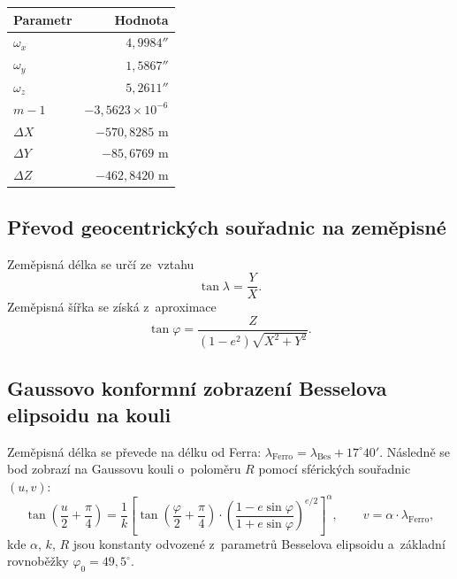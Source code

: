 \documentclass[11pt, a4paper]{article}
\begin{document}
\begin{table}[h!]
\centering
\begin{tabular}{l r}
\toprule
\textbf{Parametr} & \textbf{Hodnota} \\
\midrule
$\omega_x$ & $4{,}9984''$ \\
$\omega_y$ & $1{,}5867''$ \\
$\omega_z$ & $5{,}2611''$ \\
$m-1$ & $-3{,}5623 \times 10^{-6}$ \\
$\Delta X$ & $-570{,}8285$ m \\
$\Delta Y$ & $-85{,}6769$ m \\
$\Delta Z$ & $-462{,}8420$ m \\
\bottomrule
\end{tabular}
\end{table}

\subsection{Převod geocentrických souřadnic na zeměpisné}

Zeměpisná délka se určí ze~vztahu
\begin{equation}
    \tan\lambda = \frac{Y}{X}.
\end{equation}
Zeměpisná šířka se získá z~aproximace
\begin{equation}
    \tan\varphi = \frac{Z}{(1-e^2)\sqrt{X^2 + Y^2}}.
\end{equation}

\subsection{Gaussovo konformní zobrazení Besselova elipsoidu na kouli}

Zeměpisná délka se převede na délku od Ferra: $\lambda_{\mathrm{Ferro}} = \lambda_{\mathrm{Bes}} + 17^{\circ}40'$. Následně se bod zobrazí na Gaussovu kouli o~poloměru $R$ pomocí sférických souřadnic $(u, v)$:
\begin{equation}
    \tan\left(\frac{u}{2} + \frac{\pi}{4}\right)
    = \frac{1}{k} \left[
    \tan\left(\frac{\varphi}{2} + \frac{\pi}{4}\right)
    \cdot \left(\frac{1 - e\sin\varphi}{1 + e\sin\varphi}\right)^{e/2}
    \right]^\alpha, \qquad
    v = \alpha \cdot \lambda_{\mathrm{Ferro}},
\end{equation}
kde $\alpha$, $k$, $R$ jsou konstanty odvozené z~parametrů Besselova elipsoidu a~základní rovnoběžky $\varphi_0 = 49{,}5^{\circ}$.
\end{document}
